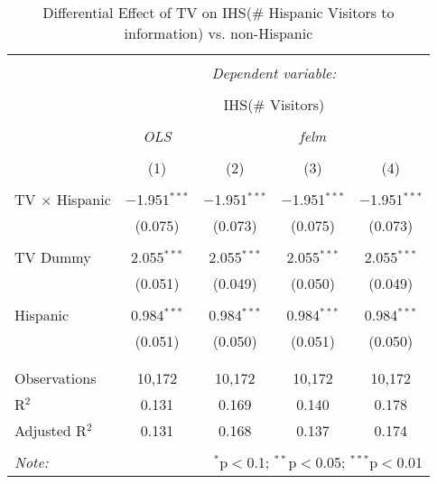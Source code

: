 
\begin{table}[!htbp] \centering 
  \caption{Differential Effect of TV on IHS(\# Hispanic Visitors to information) vs. non-Hispanic} 
  \label{} 
\begin{tabular}{@{\extracolsep{-2pt}}lcccc} 
\\[-1.8ex]\hline 
\hline \\[-1.8ex] 
 & \multicolumn{4}{c}{\textit{Dependent variable:}} \\ 
\cline{2-5} 
\\[-1.8ex] & \multicolumn{4}{c}{IHS(\# Visitors)} \\ 
\\[-1.8ex] & \textit{OLS} & \multicolumn{3}{c}{\textit{felm}} \\ 
\\[-1.8ex] & (1) & (2) & (3) & (4)\\ 
\hline \\[-1.8ex] 
 TV $\times$ Hispanic & $-$1.951$^{***}$ & $-$1.951$^{***}$ & $-$1.951$^{***}$ & $-$1.951$^{***}$ \\ 
  & (0.075) & (0.073) & (0.075) & (0.073) \\ 
  & & & & \\ 
 TV Dummy & 2.055$^{***}$ & 2.055$^{***}$ & 2.055$^{***}$ & 2.055$^{***}$ \\ 
  & (0.051) & (0.049) & (0.050) & (0.049) \\ 
  & & & & \\ 
 Hispanic & 0.984$^{***}$ & 0.984$^{***}$ & 0.984$^{***}$ & 0.984$^{***}$ \\ 
  & (0.051) & (0.050) & (0.051) & (0.050) \\ 
  & & & & \\ 
\hline \\[-1.8ex] 
Observations & 10,172 & 10,172 & 10,172 & 10,172 \\ 
R$^{2}$ & 0.131 & 0.169 & 0.140 & 0.178 \\ 
Adjusted R$^{2}$ & 0.131 & 0.168 & 0.137 & 0.174 \\ 
\hline 
\hline \\[-1.8ex] 
\textit{Note:}  & \multicolumn{4}{r}{$^{*}$p$<$0.1; $^{**}$p$<$0.05; $^{***}$p$<$0.01} \\ 
\end{tabular} 
\end{table} 
